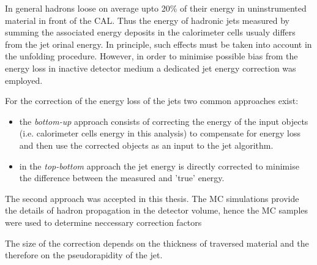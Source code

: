 In general hadrons loose on average upto 20\% of their energy in uninstrumented material in front of the CAL. Thus the energy of hadronic jets measured by summing the associated energy deposits in the calorimeter cells usualy differs from the jet orinal energy. In principle, such effects must be taken into account in the unfolding procedure. However, in order to minimise possible bias from the energy loss in inactive detector medium a dedicated jet energy correction was employed. 

For the correction of the energy loss of the jets two common approaches exist:
\begin{itemize}
 \item the \emph{bottom-up} approach consists of correcting the energy of the input objects (i.e. calorimeter cells energy in this analysis) to compensate for energy loss and then use the corrected objects as an input to the jet algorithm.
 \item in the \emph{top-bottom} approach the jet energy is directly corrected to minimise the difference between the measured and 'true' energy.
\end{itemize}
The second approach was accepted in this thesis. The MC simulations provide the details of hadron propagation in the detector volume, hence the MC samples were used to determine neccessary correction factors 

The size of the correction depends on the thickness of traversed material and the therefore on the pseudorapidity of the jet.